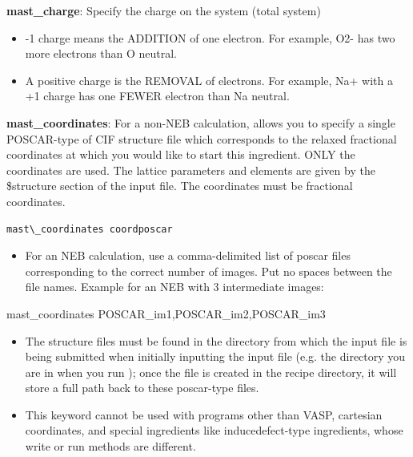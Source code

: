 \documentclass[letterpaper,10pt,english]{sphinxmanual}
\begin{document}
\textbf{mast\_charge}: Specify the charge on the system (total system)
\begin{itemize}
\item {} 
-1 charge means the ADDITION of one electron. For example, O2- has two more electrons than O neutral.

\item {} 
A positive charge is the REMOVAL of electrons. For example, Na+ with a +1 charge has one FEWER electron than Na neutral.

\end{itemize}

\textbf{mast\_coordinates}: For a non-NEB calculation, allows you to specify a single POSCAR-type of CIF structure file which corresponds to the relaxed fractional coordinates at which you would like to start this ingredient. ONLY the coordinates are used. The lattice parameters and elements are given by the \$structure section of the input file. The coordinates must be fractional coordinates.

\begin{Verbatim}[commandchars=\\\{\}]
mast\_coordinates coordposcar
\end{Verbatim}
\begin{itemize}
\item {} 
For an NEB calculation, use a comma-delimited list of poscar files corresponding to the correct number of images. Put no spaces between the file names. Example for an NEB with 3 intermediate images:

\end{itemize}

mast\_coordinates POSCAR\_im1,POSCAR\_im2,POSCAR\_im3
\begin{itemize}
\item {} 
The structure files must be found in the directory from which the input file is being submitted when initially inputting the input file (e.g. the directory you are in when you run ); once the  file is created in the recipe directory, it will store a full path back to these poscar-type files.

\item {} 
This keyword cannot be used with programs other than VASP, cartesian coordinates, and special ingredients like inducedefect-type ingredients, whose write or run methods are different.

\end{itemize}
\end{document}

